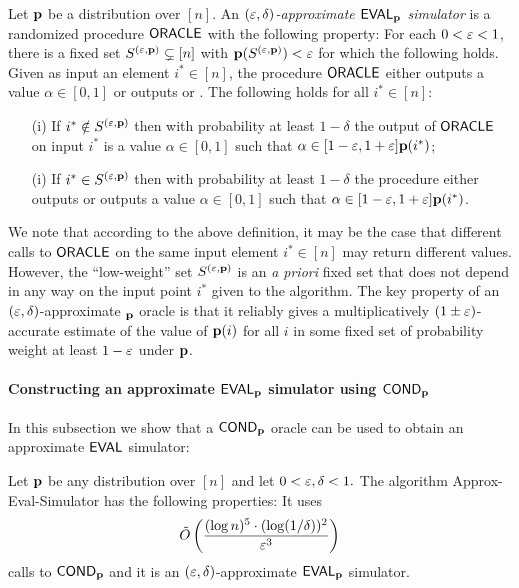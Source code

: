 \begin{definition} \label{def:approx-eval}
Let $\mathbf{p}$ be a distribution over $[n]$.
An \emph{$(\varepsilon,\delta)$-approximate ${\sf EVAL}_{\mathbf{p}}$ simulator} is a randomized
procedure ${\sf ORACLE}$ with the following property:
For each $0 < \varepsilon < 1$, there is a fixed set $S^{(\varepsilon,\mathbf{p})} \subsetneq [n]$
with $\mathbf{p}(S^{(\varepsilon,\mathbf{p})}) < \varepsilon$ for which the following holds.
Given as input an element $i^\ast \in [n]$, the procedure
${\sf ORACLE}$ either outputs a value $\alpha \in [0,1]$ or outputs \unknown{} or \fail.
The following holds for all $i^\ast \in [n]$:


\begin{itemize}

\item [(i)] If $i^\ast \notin S^{(\varepsilon,\mathbf{p})}$ then
with probability at least $1 - \delta$
the output of ${\sf ORACLE}$ on input $i^\ast$ is a value
$\alpha \in [0,1]$ such that $\alpha \in [1-\varepsilon,1+\varepsilon]\mathbf{p}(i^\ast)$;

\item [(i)] If $i^\ast \in S^{(\varepsilon,\mathbf{p})}$ then with probability at least
$1-\delta$ the procedure either outputs \unknown or outputs a value
$\alpha \in [0,1]$ such that $\alpha \in [1-\varepsilon,1+\varepsilon]\mathbf{p}(i^\ast)$.

\end{itemize}

\end{definition}
We note that according to the above definition, it may be the case that
different calls to ${\sf ORACLE}$ on the same input element $i^\ast \in [n]$
may return different values.  However, the ``low-weight'' set
$S^{(\varepsilon,\mathbf{p})}$ is an
\emph{a priori} fixed set that does not depend in any way on the input
point $i^\ast$ given to the algorithm.  The key
property of an
$(\varepsilon,\delta)$-approximate \EVAL$_{\mathbf{p}}$ oracle is that it
reliably gives a multiplicatively $(1 \pm  \varepsilon)$-accurate estimate of
the value of $\mathbf{p}(i)$ for all $i$ in some
fixed set of probability weight at least $1-\varepsilon$ under $\mathbf{p}$.


\paragraph{Constructing an approximate \texorpdfstring{${\sf EVAL}_{\mathbf{p}}$}{\EVAL} simulator using \texorpdfstring{${\sf COND}_{\mathbf{p}}$}{\COND}}
\label{sec:approx-eval-simulator}


In this subsection we show that a ${\sf COND}_{\mathbf{p}}$ oracle can be used to
obtain an approximate ${\sf EVAL}$ simulator:

\begin{theorem} \label{thm:approx-eval-simulator}
Let $\mathbf{p}$ be any distribution over $[n]$ and let
$0 < \varepsilon,\delta < 1.$ The algorithm
{\sc Approx-Eval-Simulator} has the following properties:  It
uses
\[
\tilde{O}\left(
{\frac {(\log n)^5 \cdot (\log (1/\delta))^2}{\varepsilon^3}}
\right)
\]
calls to
${\sf COND}_{\mathbf{p}}$ and it is an $(\varepsilon,\delta)$-approximate ${\sf EVAL}_{\mathbf{p}}$ simulator.
\end{theorem}

